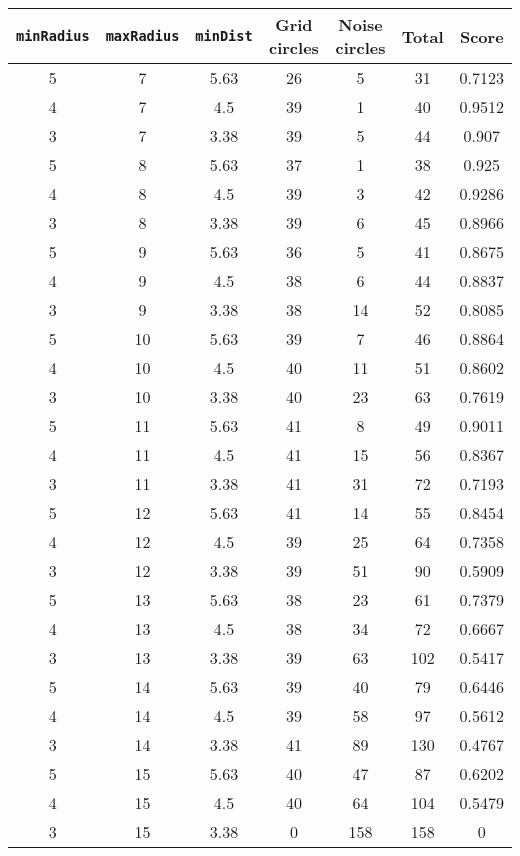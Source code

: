 \documentclass[letterpaper, 12pt]{article}
\begin{document}
\begin{longtable}{|c|c|c|c|c|c|c|}
\hline
\textbf{\texttt{minRadius}} & \textbf{\texttt{maxRadius}} & \textbf{\texttt{minDist}} & \textbf{Grid circles} & \textbf{Noise circles} & \textbf{Total} & \textbf{Score} \\
\hline
5 & 7 & 5.63 & 26 & 5 & 31 & 0.7123 \\
\hline
4 & 7 & 4.5 & 39 & 1 & 40 & 0.9512 \\
\hline
3 & 7 & 3.38 & 39 & 5 & 44 & 0.907 \\
\hline
5 & 8 & 5.63 & 37 & 1 & 38 & 0.925 \\
\hline
4 & 8 & 4.5 & 39 & 3 & 42 & 0.9286 \\
\hline
3 & 8 & 3.38 & 39 & 6 & 45 & 0.8966 \\
\hline
5 & 9 & 5.63 & 36 & 5 & 41 & 0.8675 \\
\hline
4 & 9 & 4.5 & 38 & 6 & 44 & 0.8837 \\
\hline
3 & 9 & 3.38 & 38 & 14 & 52 & 0.8085 \\
\hline
5 & 10 & 5.63 & 39 & 7 & 46 & 0.8864 \\
\hline
4 & 10 & 4.5 & 40 & 11 & 51 & 0.8602 \\
\hline
3 & 10 & 3.38 & 40 & 23 & 63 & 0.7619 \\
\hline
5 & 11 & 5.63 & 41 & 8 & 49 & 0.9011 \\
\hline
4 & 11 & 4.5 & 41 & 15 & 56 & 0.8367 \\
\hline
3 & 11 & 3.38 & 41 & 31 & 72 & 0.7193 \\
\hline
5 & 12 & 5.63 & 41 & 14 & 55 & 0.8454 \\
\hline
4 & 12 & 4.5 & 39 & 25 & 64 & 0.7358 \\
\hline
3 & 12 & 3.38 & 39 & 51 & 90 & 0.5909 \\
\hline
5 & 13 & 5.63 & 38 & 23 & 61 & 0.7379 \\
\hline
4 & 13 & 4.5 & 38 & 34 & 72 & 0.6667 \\
\hline
3 & 13 & 3.38 & 39 & 63 & 102 & 0.5417 \\
\hline
5 & 14 & 5.63 & 39 & 40 & 79 & 0.6446 \\
\hline
4 & 14 & 4.5 & 39 & 58 & 97 & 0.5612 \\
\hline
3 & 14 & 3.38 & 41 & 89 & 130 & 0.4767 \\
\hline
5 & 15 & 5.63 & 40 & 47 & 87 & 0.6202 \\
\hline
4 & 15 & 4.5 & 40 & 64 & 104 & 0.5479 \\
\hline
3 & 15 & 3.38 & 0 & 158 & 158 & 0 \\

\end{longtable}
\end{document}
